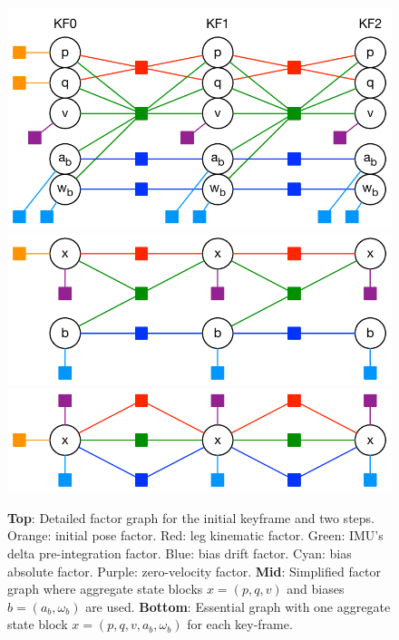\begin{figure}[tb]
\begin{center}
\includegraphics[scale=0.65]{figures/graph_exploded}
\includegraphics[scale=0.65]{figures/graph_simplified}
\includegraphics[scale=0.65]{figures/graph_essential}
\caption{{\bf Top}: Detailed factor graph for the initial keyframe and two steps. Orange: initial pose factor. Red: leg kinematic factor. Green: IMU's delta pre-integration factor. Blue: bias drift factor. Cyan: bias absolute factor. Purple: zero-velocity factor. {\bf Mid}: Simplified factor graph where aggregate state blocks $x=(p,q,v)$ and biases $b=(a_b,\omega_b)$ are used. {\bf Bottom}: Essential graph with one aggregate state block $x=(p,q,v,a_b,\omega_b)$ for each key-frame.}
\label{default}
\end{center}
\end{figure}


